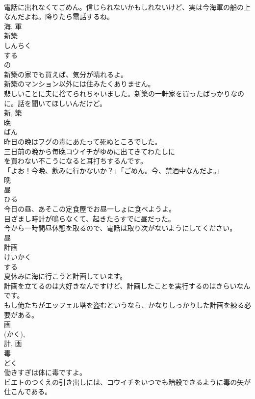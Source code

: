 \documentclass[8pt]{extreport}
\begin{document}
\begin{CJK}{UTF8}{min}
\\	電話に出れなくてごめん。信じられないかもしれないけど、実は今海軍の船の上なんだよね。降りたら電話するね。	
\\	海, 軍	
\\	新築	
\\	しんちく	
\\	する 
\\	の 
\\	新築の家でも買えば、気分が晴れるよ。	
\\	新築のマンション以外には住みたくありません。	
\\	悲しいことに夫に捨てられちゃいました。新築の一軒家を買ったばっかりなのに。話を聞いてほしいんだけど。	
\\	新, 築	
\\	晩	
\\	ばん	
\\	昨日の晩はフグの毒にあたって死ぬところでした。	
\\	三日前の晩から毎晩コウイチがゆめに出てきてわたしに
\\	を買わない不こうになると耳打ちするんです。	
\\	「よお！今晩、飲みに行かないか？」「ごめん。今、禁酒中なんだよ。」	
\\	晩	
\\	昼	
\\	ひる	
\\	今日の昼、あそこの定食屋でお昼一しょに食べようよ。	
\\	目ざまし時計が鳴らなくて、起きたらすでに昼だった。	
\\	今から一時間昼休憩を取るので、電話は取り次がないようにしてください。	
\\	昼	
\\	計画	
\\	けいかく	
\\	する 
\\	夏休みに海に行こうと計画しています。	
\\	計画を立てるのは大好きなんですけど、計画したことを実行するのはきらいなんです。	
\\	もし俺たちがエッフェル塔を盗むというなら、かなりしっかりした計画を練る必要がある。	
\\	画 
\\	(かく), 
\\	計, 画	
\\	毒	
\\	どく	
\\	働きすぎは体に毒ですよ。	
\\	ビエトのつくえの引き出しには、コウイチをいつでも暗殺できるように毒の矢が仕こんである。	

\end{CJK}
\end{document}

